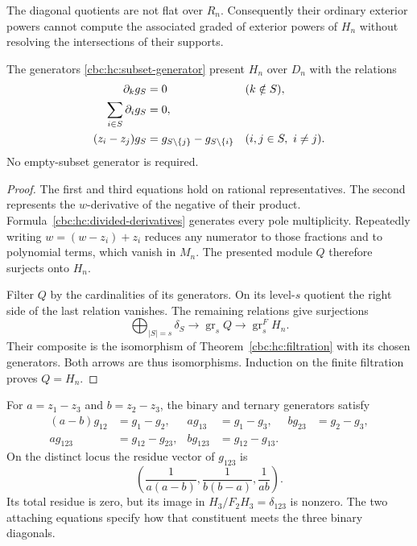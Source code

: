 The diagonal quotients are not flat over $R_n$. Consequently
their ordinary exterior powers cannot compute the associated
graded of exterior powers of $H_n$ without resolving the
intersections of their supports.

\begin{theorem}
\label{cbc:hc:presentation}
The generators \eqref{cbc:hc:subset-generator} present $H_n$
over $D_n$ with the relations
\begin{align}
 \partial_k g_S&=0 &&(k\notin S),\notag\\
 \sum_{i\in S}\partial_i g_S&=0,\notag\\
 (z_i-z_j)g_S&=g_{S\setminus\{j\}}-g_{S\setminus\{i\}}
       &&(i,j\in S,\ i\ne j).
 \label{cbc:hc:presentation-relations}
\end{align}
No empty-subset generator is required.
\end{theorem}

\begin{proof}
The first and third equations hold on rational representatives.
The second represents the $w$-derivative of the negative of
their product. Formula~\eqref{cbc:hc:divided-derivatives}
generates every pole multiplicity. Repeatedly writing
$w=(w-z_i)+z_i$ reduces any numerator to those fractions
and to polynomial terms, which vanish in $M_n$.
The presented module $Q$ therefore surjects onto $H_n$.

Filter $Q$ by the cardinalities of its generators. On its
level-$s$ quotient the right side of the last relation
vanishes. The remaining relations give surjections
\[
 \bigoplus_{|S|=s}\delta_S\longrightarrow
 \operatorname{gr}_sQ\longrightarrow\operatorname{gr}_s^FH_n.
\]
Their composite is the isomorphism of
Theorem~\ref{cbc:hc:filtration} with its chosen generators.
Both arrows are thus isomorphisms. Induction on the finite
filtration proves $Q=H_n$.
\end{proof}

\begin{example}\label{cbc:hc:triple}
For $a=z_1-z_3$ and $b=z_2-z_3$, the binary and ternary
generators satisfy
\begin{align*}
 (a-b)g_{12}&=g_1-g_2,& ag_{13}&=g_1-g_3,&
 bg_{23}&=g_2-g_3,\\
 ag_{123}&=g_{12}-g_{23},&
 bg_{123}&=g_{12}-g_{13}.&&
\end{align*}
On the distinct locus the residue vector of $g_{123}$ is
\[
 \left(\frac1{a(a-b)},\frac1{b(b-a)},\frac1{ab}\right).
\]
Its total residue is zero, but its image in
$H_3/F_2H_3=\delta_{123}$ is nonzero. The two attaching
equations specify how that constituent meets the three
binary diagonals.
\end{example}

